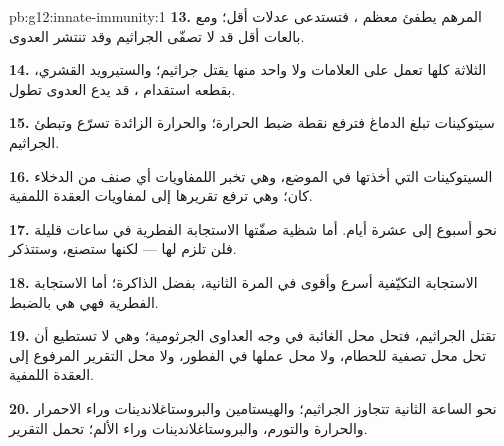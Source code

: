 \begin{solution}{pb:g12:innate-immunity:1}
\textbf{13.} المرهم يطفئ معظم ، فتستدعى عدلات أقل؛ ومع بالعات
أقل قد لا تصفّى الجراثيم وقد تنتشر العدوى.

\textbf{14.} الثلاثة كلها تعمل على العلامات ولا واحد منها يقتل
جراثيم؛ والستيرويد القشري، بقطعه استقدام ، قد يدع العدوى تطول.

\textbf{15.} سيتوكينات تبلغ الدماغ فترفع نقطة ضبط الحرارة؛ والحرارة
الزائدة تسرّع  وتبطئ الجراثيم.

\textbf{16.} السيتوكينات التي أخذتها في الموضع، وهي تخبر اللمفاويات
أي صنف من الدخلاء كان؛ وهي ترفع تقريرها إلى لمفاويات العقدة اللمفية.

\textbf{17.} نحو أسبوع إلى عشرة أيام. أما شظية صفّتها الاستجابة
الفطرية في ساعات قليلة فلن تلزم لها --- لكنها ستصنع، وستتذكر.

\textbf{18.} الاستجابة التكيّفية أسرع وأقوى في المرة الثانية، بفضل
الذاكرة؛ أما الاستجابة الفطرية فهي هي بالضبط.

\textbf{19.}  تقتل الجراثيم، فتحل محل 
الغائبة في وجه العداوى الجرثومية؛ وهي لا تستطيع أن تحل محل تصفية
 للحطام، ولا محل عملها في الفطور، ولا محل التقرير المرفوع إلى
العقدة اللمفية.

\textbf{20.} نحو الساعة الثانية تتجاوز  الجراثيم؛ والهيستامين
والبروستاغلاندينات وراء الاحمرار والحرارة والتورم، والبروستاغلاندينات
وراء الألم؛  تحمل التقرير.
\end{solution}
